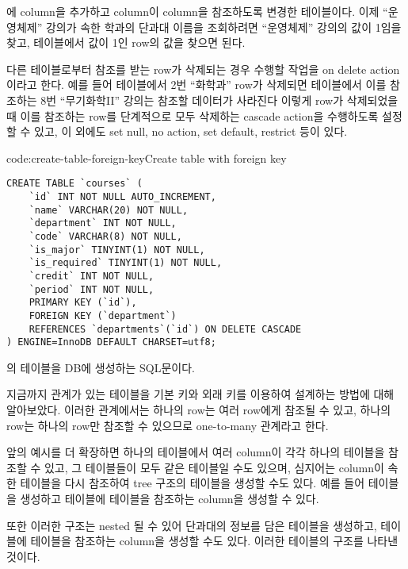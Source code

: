 \는 에  column을 추가하고  column이  column을 참조하도록 변경한 테이블이다. 이제 ``운영체제'' 강의가 속한 학과의 단과대 이름을 조회하려면 ``운영체제'' 강의의  값이 1임을 찾고,  테이블에서  값이 1인 row의  값을 찾으면 된다.

다른 테이블로부터 참조를 받는 row가 삭제되는 경우 수행할 작업을 on delete action이라고 한다. 예를 들어  테이블에서 2번 ``화학과'' row가 삭제되면  테이블에서 이를 참조하는 8번 ``무기화학II'' 강의는 참조할 데이터가 사라진다 이렇게 row가 삭제되었을 때 이를 참조하는 row를 단계적으로 모두 삭제하는 cascade action을 수행하도록 설정할 수 있고, 이 외에도 set null, no action, set default, restrict 등이 있다.

\begin{code}{code:create-table-foreign-key}{Create  table with foreign key}
\begin{verbatim}
CREATE TABLE `courses` (
    `id` INT NOT NULL AUTO_INCREMENT,
    `name` VARCHAR(20) NOT NULL,
    `department` INT NOT NULL,
    `code` VARCHAR(8) NOT NULL,
    `is_major` TINYINT(1) NOT NULL,
    `is_required` TINYINT(1) NOT NULL,
    `credit` INT NOT NULL,
    `period` INT NOT NULL,
    PRIMARY KEY (`id`),
    FOREIGN KEY (`department`)
    REFERENCES `departments`(`id`) ON DELETE CASCADE
) ENGINE=InnoDB DEFAULT CHARSET=utf8;
\end{verbatim}
\end{code}

\는 의 테이블을 DB에 생성하는 SQL문이다.

지금까지 관계가 있는 테이블을 기본 키와 외래 키를 이용하여 설계하는 방법에 대해 알아보았다. 이러한 관계에서는 하나의  row는 여러  row에게 참조될 수 있고, 하나의  row는 하나의  row만 참조할 수 있으므로 one-to-many 관계라고 한다.

앞의 예시를 더 확장하면 하나의 테이블에서 여러 column이 각각 하나의 테이블을 참조할 수 있고, 그 테이블들이 모두 같은 테이블일 수도 있으며, 심지어는 column이 속한 테이블을 다시 참조하여 tree 구조의 테이블을 생성할 수도 있다. 예를 들어  테이블을 생성하고  테이블에  테이블을 참조하는  column을 생성할 수 있다.

또한 이러한 구조는 nested 될 수 있어 단과대의 정보를 담은  테이블을 생성하고,  테이블에  테이블을 참조하는 column을 생성할 수도 있다. \은 이러한  테이블의 구조를 나타낸 것이다.

